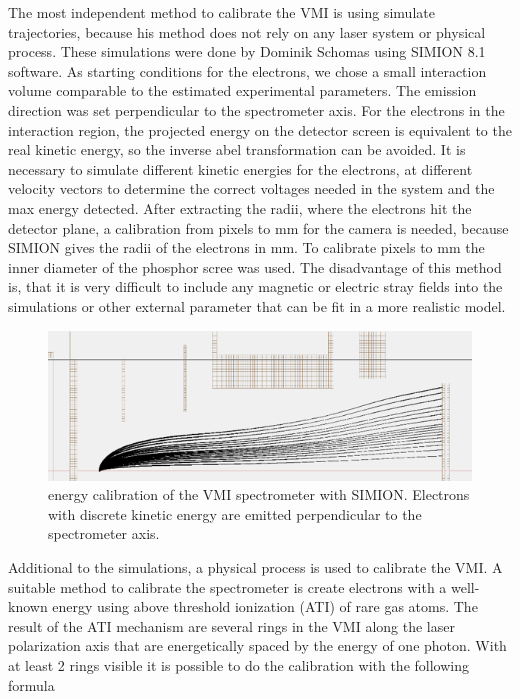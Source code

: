 The most independent method to calibrate the VMI is using simulate trajectories, because his method does not rely on any laser system or physical process. These simulations were done by Dominik Schomas using SIMION 8.1 software. As starting conditions for the electrons, we chose a small interaction volume comparable to the estimated experimental parameters. The emission direction was set perpendicular to the spectrometer axis. For the electrons in the interaction region, the projected energy on the detector screen is equivalent to the real kinetic energy, so the inverse abel transformation can be avoided. It is necessary to simulate different kinetic energies for the electrons, at different velocity vectors to determine the correct voltages needed in the system and the max energy detected. After extracting the radii, where the electrons hit the detector plane, a calibration from pixels to mm for the camera is needed, because SIMION gives the radii of the electrons in mm. To calibrate pixels to mm the inner diameter of the phosphor scree was used. The disadvantage of this method is, that it is very difficult to include any magnetic or electric stray fields into the simulations or other external parameter that can be fit in a more realistic model.

\begin{figure}[h!]
\centering
\includegraphics[scale=1]{../images/simion_calib.png}
\caption{energy calibration of the VMI spectrometer with SIMION. Electrons with discrete kinetic energy are emitted perpendicular to the spectrometer axis.}
\end{figure}


Additional to the simulations, a physical process is used to calibrate the VMI. A suitable method to calibrate the spectrometer is create electrons with a well-known energy using above threshold ionization (ATI) of rare gas atoms. The result of the ATI mechanism are several rings in the VMI along the laser polarization axis that are energetically spaced by the energy of one photon. With at least 2 rings visible it is possible to do the calibration with the following formula

